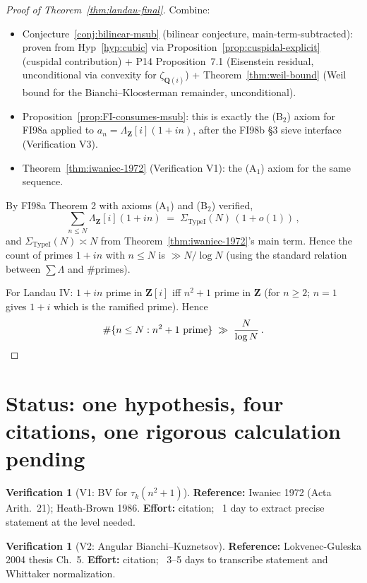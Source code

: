 \documentclass[11pt]{article}
\theoremstyle{definition}
\newtheorem{verification}[theorem]{Verification}
\newcommand{\Z}{\mathbf{Z}}
\newcommand{\Q}{\mathbf{Q}}
\newcommand{\Zi}{\Z[i]}
\newcommand{\Qi}{\Q(i)}
\begin{document}
\begin{proof}[Proof of Theorem~\ref{thm:landau-final}]
Combine:
\begin{itemize}
\item Conjecture~\ref{conj:bilinear-msub} (bilinear conjecture, main-term-subtracted): proven from Hyp~\ref{hyp:cubic} via Proposition~\ref{prop:cuspidal-explicit} (cuspidal contribution) + P14 Proposition~7.1 (Eisenstein residual, unconditional via convexity for $\zeta_{\Qi}$) + Theorem~\ref{thm:weil-bound} (Weil bound for the Bianchi--Kloosterman remainder, unconditional).
\item Proposition~\ref{prop:FI-consumes-msub}: this is exactly the (B$_2$) axiom for FI98a applied to $a_n=\Lambda_\Zi(1+in)$, after the FI98b §3 sieve interface (Verification V3).
\item Theorem~\ref{thm:iwaniec-1972} (Verification V1): the (A$_1$) axiom for the same sequence.
\end{itemize}
By FI98a Theorem 2 with axioms (A$_1$) and (B$_2$) verified,
\[
   \sum_{n\le N}\Lambda_\Zi(1+in)\;=\;\Sigma_{\mathrm{TypeI}}(N)\,(1+o(1))\,,
\]
and $\Sigma_{\mathrm{TypeI}}(N)\asymp N$ from Theorem~\ref{thm:iwaniec-1972}'s main term. Hence the count of primes $1+in$ with $n\le N$ is $\gg N/\log N$ (using the standard relation between $\sum\Lambda$ and $\#\text{primes}$).

For Landau IV: $1+in$ prime in $\Zi$ iff $n^2+1$ prime in $\Z$ (for $n\ge 2$; $n=1$ gives $1+i$ which is the ramified prime). Hence
\[
   \#\{n\le N:n^2+1\text{ prime}\}\;\gg\;\frac{N}{\log N}\,.\qedhere
\]
\end{proof}

\section{Status: one hypothesis, four citations, one rigorous calculation pending}\label{sec:status-final}

\begin{verification}[V1: BV for $\tau_k(n^2+1)$]\label{ver:V1-final}
\textbf{Reference:} Iwaniec 1972 (Acta Arith.~21); Heath-Brown 1986. \textbf{Effort:} citation; ~1 day to extract precise statement at the level needed.
\end{verification}

\begin{verification}[V2: Angular Bianchi--Kuznetsov]\label{ver:V2-final}
\textbf{Reference:} Lokvenec-Guleska 2004 thesis Ch.~5. \textbf{Effort:} citation; ~3--5 days to transcribe statement and Whittaker normalization.
\end{verification}
\end{document}
